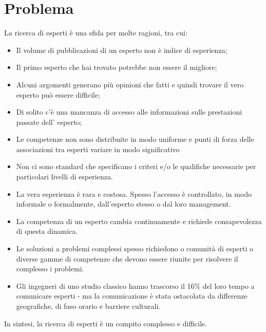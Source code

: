 \chapter{Problema}
La ricerca di esperti è una sfida per molte ragioni, tra cui:
\begin{itemize}
	\item Il volume di pubblicazioni di un esperto non è indice di esperienza;
	\item Il primo esperto che hai trovato potrebbe non essere il migliore;
	\item Alcuni argomenti generano più opinioni che fatti e quindi trovare il vero esperto può essere difficile;
	\item Di solito c'è una mancanza di accesso alle informazioni sulle prestazioni passate dell' esperto;
	\item Le competenze non sono distribuite in modo uniforme e punti di forza delle associazioni tra esperti variare in modo significativo
	\item Non ci sono standard che specificano i criteri e/o le qualifiche necessarie per particolari livelli di esperienza.
	\item La vera esperienza è rara e costosa. Spesso l'accesso è controllato, in modo informale o formalmente, dall'esperto stesso o dal loro management.
	\item La competenza di un esperto cambia continuamente e richiede consapevolezza di questa dinamica. 
	\item Le soluzioni a problemi complessi spesso richiedono o comunità di esperti o diverse gamme di competenze che devono essere riunite per risolvere il complesso i problemi.
	\item  Gli ingegneri di uno studio classico hanno trascorso il 16\% del loro tempo a comunicare esperti - ma la comunicazione è stata ostacolata da differenze geografiche, di fuso orario e barriere culturali.
\end{itemize}
In sintesi, la ricerca di esperti è un compito complesso e difficile.